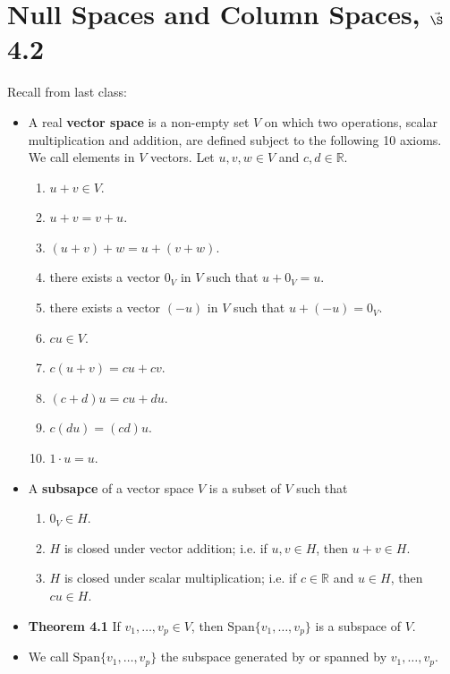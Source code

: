 


%

%

\section{{Null Spaces and Column Spaces, $\vec\S$4.2}}%
% 

%
\thispagestyle{fancy}

Recall from last class:

\begin{itemize}
\item A real {\bf vector space} is a non-empty set $V$ on which two operations, scalar multiplication and addition, are defined subject to the following 10 axioms. We call elements in $V$ vectors. Let $u,v,w \in V$ and $c,d\in \mathbb{R}$.
\begin{enumerate}
\item $u+v \in V$.
\item $u+v=v+u$.
\item $(u+v)+w=u+(v+w)$.
\item there exists a vector $0_V$ in $V$ such that $u+0_V=u$.
\item there exists a vector $(-u)$ in $V$ such that $u+(-u)=0_V$.
\item $cu \in V$.
\item $c(u+v)=cu+cv$.
\item $(c+d)u=cu+du$.
\item $c(du)=(cd)u$.
\item $1\cdot u =u$.
\end{enumerate}
\item A {\bf subsapce} of a vector space $V$ is a subset of $V$ such that
\begin{enumerate}
\item $0_V \in H$.
\item $H$ is closed under vector addition; i.e. if $u, v \in H$, then $u+v \in H$.
\item $H$ is closed under scalar multiplication; i.e. if $c \in \mathbb{R}$ and $u \in H$, then $cu \in H$.
\end{enumerate}
\item {\bf Theorem 4.1} If $v_1, \dots, v_p \in V$, then $\text{Span}\{v_1 ,\dots, v_p\}$ is a subspace of $V$. 
\item We call $\text{Span}\{v_1 ,\dots, v_p\}$ the subspace generated by or spanned by $v_1,\dots, v_p$.
\end{itemize}

